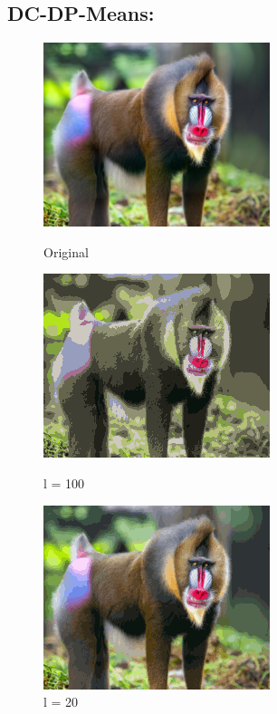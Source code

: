 \documentclass[12pt]{article}
\begin{document}
    \subsection*{DC-DP-Means:}
        \begin{figure}[!h]
        \begin{minipage}{0.5\textwidth}
        \centering
        \includegraphics[]{images/monkey_compressed}
        \caption{Original}
        \end{minipage}
        \begin{minipage}{0.5\textwidth}
        \centering
        \includegraphics[]{images/monkey_clustered_pdc_dp_means_l_100}
        \caption{l = 100}
        \end{minipage}
        \begin{minipage}{0.5\textwidth}
        \centering
        \includegraphics[]{images/monkey_clustered_pdc_dp_means_l_20}
        \caption{l = 20}
        \end{minipage}

\end{figure}
\end{document}
